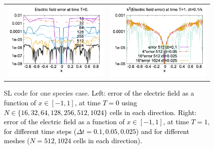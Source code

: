 \documentclass{article}
\numberwithin{equation}{section}
\newcommand{\imh}{\textheight} %
\begin{document}
\begin{figure}
	\centering
	\renewcommand{\imh}{0.45\linewidth}
	\begin{tabular}{cc}
	\includegraphics[width=\imh]{images/malkov_SL1.png} & %
	\includegraphics[width=\imh]{images/malkov_SL4.png}
	\end{tabular}
	\caption{SL code for one species case. \textcolor{black}{Left: error of the electric field as a function of $x\in [-1,1]$, at  time $T=0$ 
	using $N\in \{16,32,64,128,256,512,1024\}$ cells in each direction. 
	Right: error of the electric field as a function of $x\in[-1,1]$, at time $T=1$, for different time steps ($\Delta t=0.1, 0.05, 0.025$) 
	and for different meshes ($N=512, 1024$ cells in each direction). }}
	\label{fig:SLresult1sp}
\end{figure}
\end{document}
